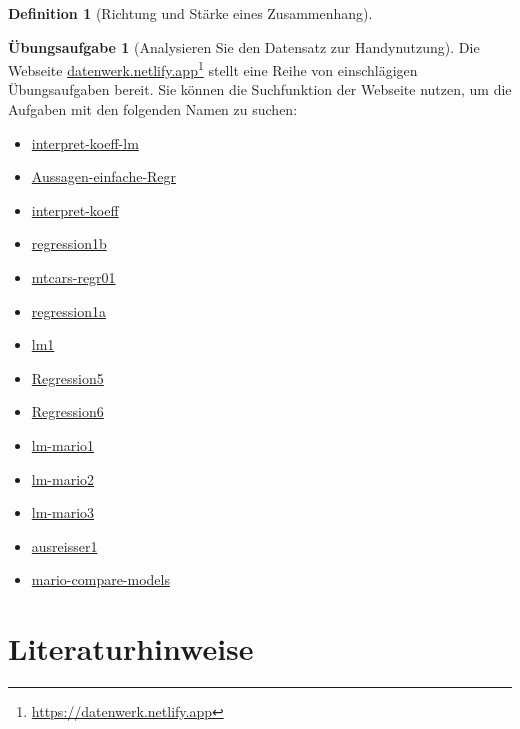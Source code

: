\documentclass[
  a4paper,
  DIV=11]{scrreprt}
\providecommand{\tightlist}{%
  \setlength{\itemsep}{0pt}\setlength{\parskip}{0pt}}\usepackage{longtable,booktabs,array}
\theoremstyle{definition}
\newtheorem{exercise}{Übungsaufgabe}[chapter]
\theoremstyle{definition}
\theoremstyle{definition}
\newtheorem{definition}{Definition}[chapter]
\theoremstyle{remark}
\begin{document}
\begin{definition}[Richtung und Stärke eines
Zusammenhang]
\begin{exercise}[Analysieren Sie den Datensatz zur
Handynutzung]
Die Webseite
\href{https://datenwerk.netlify.app}{datenwerk.netlify.app}\footnote{\url{https://datenwerk.netlify.app}}
stellt eine Reihe von einschlägigen Übungsaufgaben bereit. Sie können
die Suchfunktion der Webseite nutzen, um die Aufgaben mit den folgenden
Namen zu suchen:

\begin{itemize}
\tightlist
\item
  \href{https://datenwerk.netlify.app/posts/interpret-koeff-lm/interpret-koeff-lm.html}{interpret-koeff-lm}
\item
  \href{https://datenwerk.netlify.app/posts/aussagen-einfache-regr/aussagen-einfache-regr}{Aussagen-einfache-Regr}
\item
  \href{https://datenwerk.netlify.app/posts/interpret-koeff/interpret-koeff.html}{interpret-koeff}
\item
  \href{https://datenwerk.netlify.app/posts/regression1b/regression1b.html}{regression1b}
\item
  \href{https://datenwerk.netlify.app/posts/mtcars-regr01/mtcars-regr01.html}{mtcars-regr01}
\item
  \href{https://datenwerk.netlify.app/posts/regression1a/regression1a.html}{regression1a}
\item
  \href{https://datenwerk.netlify.app/posts/lm1/lm1.html}{lm1}
\item
  \href{https://datenwerk.netlify.app/posts/regression5/regression5}{Regression5}
\item
  \href{https://datenwerk.netlify.app/posts/regression6/regression6}{Regression6}
\item
  \href{https://datenwerk.netlify.app/posts/lm-mario1/lm-mario1.html}{lm-mario1}
\item
  \href{https://datenwerk.netlify.app/posts/lm-mario2/lm-mario2.html}{lm-mario2}
\item
  \href{https://datenwerk.netlify.app/posts/lm-mario3/lm-mario3.html}{lm-mario3}
\item
  \href{https://datenwerk.netlify.app/posts/ausreisser1/ausreisser1.html}{ausreisser1}
\item
  \href{https://datenwerk.netlify.app/posts/mario-compare-models/}{mario-compare-models}
\end{itemize}

\section{Literaturhinweise}\label{literaturhinweise-8}


\end{exercise}
\end{definition}
\end{document}
